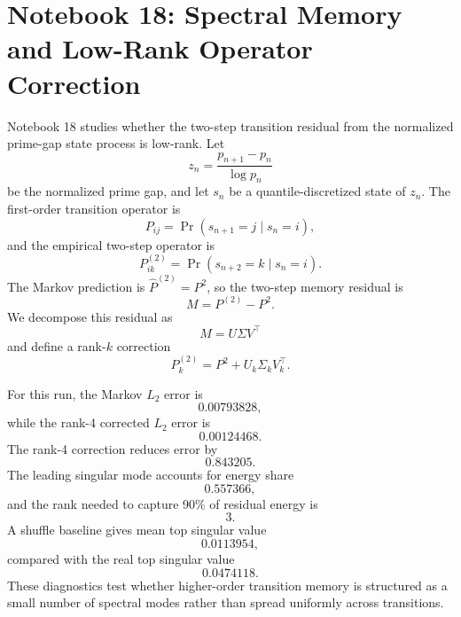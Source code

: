 
\section{Notebook 18: Spectral Memory and Low-Rank Operator Correction}

Notebook 18 studies whether the two-step transition residual from the normalized
prime-gap state process is low-rank.  Let
\[
z_n = \frac{p_{n+1}-p_n}{\log p_n}
\]
be the normalized prime gap, and let $s_n$ be a quantile-discretized state of
$z_n$.  The first-order transition operator is
\[
P_{ij}=\Pr(s_{n+1}=j\mid s_n=i),
\]
and the empirical two-step operator is
\[
P^{(2)}_{ik}=\Pr(s_{n+2}=k\mid s_n=i).
\]
The Markov prediction is $\widehat{P}^{(2)}=P^2$, so the two-step memory
residual is
\[
M=P^{(2)}-P^2.
\]
We decompose this residual as
\[
M=U\Sigma V^\top
\]
and define a rank-$k$ correction
\[
P^{(2)}_k=P^2+U_k\Sigma_kV_k^\top.
\]

For this run, the Markov $L_2$ error is
\[
0.00793828,
\]
while the rank-4 corrected $L_2$ error is
\[
0.00124468.
\]
The rank-4 correction reduces error by
\[
0.843205.
\]
The leading singular mode accounts for energy share
\[
0.557366,
\]
and the rank needed to capture 90\% of residual energy is
\[
3.
\]
A shuffle baseline gives mean top singular value
\[
0.0113954,
\]
compared with the real top singular value
\[
0.0474118.
\]
These diagnostics test whether higher-order transition memory is structured as a
small number of spectral modes rather than spread uniformly across transitions.
